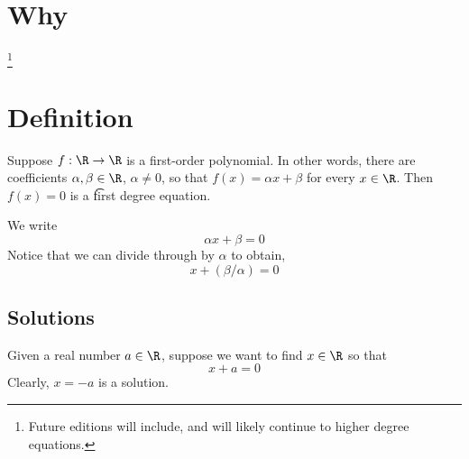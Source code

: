 
\section*{Why}
\footnote{Future editions will include, and will likely continue to higher degree equations.}
\section*{Definition}

Suppose $f: \R  \to \R $ is a first-order polynomial.
In other words, there are coefficients $\alpha , \beta  \in \R $, $\alpha  \neq 0$, so that $f(x) = \alpha  x + \beta $ for every $x \in \R $.
Then $f(x) = 0$ is a \t{first degree equation}.

We write
\[
\alpha x + \beta  = 0
\]
Notice that we can divide through by $\alpha $ to obtain,
\[
x + (\beta /\alpha ) = 0
\]

\subsection*{Solutions}

Given a real number $a \in \R $, suppose we want to find $x \in \R $ so that
\[
x + a = 0
\]
Clearly, $x = -a$ is a solution.

\blankpage